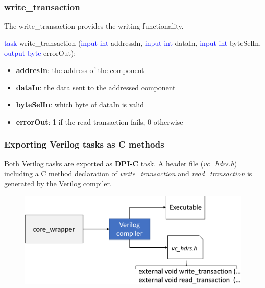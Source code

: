 \documentclass{beamer}
\begin{document}
\begin{frame}

\frametitle{write\_transaction}

The write\_transaction provides the writing functionality.

\begin{block}{}
	\textcolor{blue}{task} write\_transaction
	(\textcolor{blue}{input int} addressIn, \textcolor{blue}{input int} dataIn,
	\textcolor{blue}{input int} byteSelIn, \textcolor{blue}{output byte} errorOut);
\end{block}

\begin{itemize}
	\item \textbf{addresIn}: the address of the component
	\item \textbf{dataIn}: the data sent to the addressed component
	\item \textbf{byteSelIn}: which byte of dataIn is valid
	\item \textbf{errorOut}: 1 if the read transaction fails, 0 otherwise
\end{itemize}

\end{frame}

\begin{frame}

\frametitle{Exporting Verilog tasks as C methods}

Both Verilog tasks are exported as \textbf{DPI-C} task.
A header file (\textit{vc\_hdrs.h}) including a C method declaration of 
\textit{write\_transaction} and \textit{read\_transaction} is generated by 
the Verilog compiler.

\begin{figure}
	\centering
	\includegraphics[width=0.7\columnwidth]{figures/vc_hdrs_file-crop.pdf}
\end{figure}

\end{frame}
\end{document}
